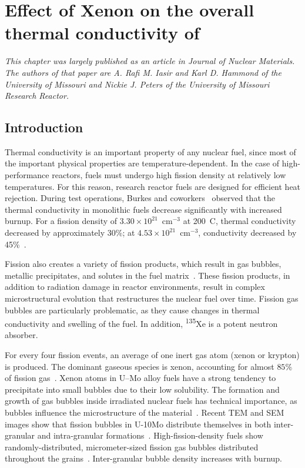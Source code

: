 \chapter{Effect of Xenon on the overall thermal conductivity of \protect{}}
\textit{This chapter was largely published as an article in Journal of Nuclear Materials. The authors of that paper are A. Rafi M. Iasir and Karl D. Hammond of the University of Missouri and Nickie J. Peters of the University of Missouri Research Reactor.}

\section{Introduction}\label{sec:introduction_ch1}
Thermal conductivity is an important property of any nuclear fuel, since most of the important physical properties are temperature-dependent. In the case of high-performance reactors, fuels must undergo high fission density at relatively low temperatures. For this reason, research reactor fuels are designed for efficient heat rejection. During test operations, Burkes and coworkers~\cite{burkes2015thermal} observed that the thermal conductivity in monolithic fuels decrease significantly with increased burnup. For a fission density of $3.30\times10^{21}$~cm$^{-3}$ at 200~\textdegree C, thermal conductivity decreased by approximately 30\%; at $4.53\times10^{21}$~cm$^{-3}$, conductivity decreased by 45\%~\cite{burkes2015thermal}.

Fission also creates a variety of fission products, which result in gas bubbles, metallic precipitates, and solutes in the fuel matrix~\cite{rondinella2010high}. These fission products, in addition to radiation damage in reactor environments, result in complex microstructural evolution that restructures the nuclear fuel over time. Fission gas bubbles are particularly problematic, as they cause changes in thermal conductivity and swelling of the fuel. In addition, \textsuperscript{135}Xe is a potent neutron absorber.

For every four fission events, an average of one inert gas atom (xenon or krypton) is produced. The dominant gaseous species is xenon, accounting for almost $85\%$ of fission gas~\cite{blades1956ratio,petruska1955absolute}. Xenon atoms in U--Mo alloy fuels have a strong tendency to precipitate into small bubbles due to their low solubility. The formation and growth of gas bubbles inside irradiated nuclear fuels has technical importance, as bubbles influence the microstructure of the material~\cite{kim2011fission}. Recent TEM and SEM images show that fission bubbles in U-10Mo distribute themselves in both inter-granular and intra-granular formations~\cite{miller2015transmission,miller2012advantages, gan2010transmission, gan2012tem}. High-fission-density fuels show randomly-distributed, micrometer-sized fission gas bubbles distributed throughout the grains~\cite{gan2012tem}. Inter-granular bubble density increases with burnup. 

